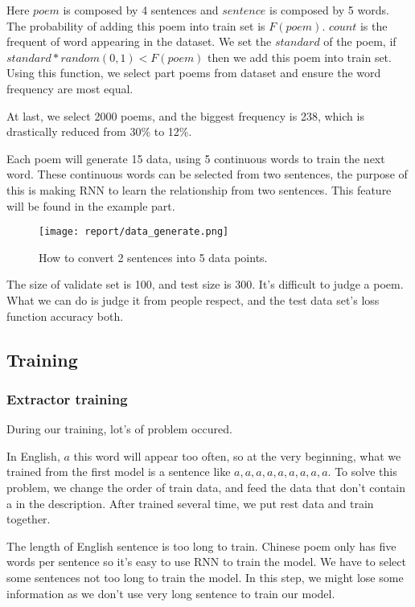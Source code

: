 \documentclass[10pt,twocolumn,letterpaper]{article}
\begin{document}
Here $poem$ is composed by 4 sentences and $sentence$ is composed by 5 words. The probability of adding this poem into train set is $F(poem)$. $count$ is the frequent of word appearing in the dataset. We set the $standard$ of the poem, if $standard*random(0, 1) < F(poem)$ then we add this poem into train set.
Using this function, we select part poems from dataset and ensure the word frequency are most equal. 

At last, we select 2000 poems, and the biggest frequency is 238, which is drastically reduced from 30\% to 12\%. 

Each poem will generate 15 data, using 5 continuous words to train the next word. These continuous words can be selected from two sentences, the purpose of this is making RNN to learn the relationship from two sentences. This feature will be found in the example part.

\begin{figure}[t]
\begin{center}
   \texttt{[image: report/data\_generate.png]}
\end{center}
   \caption{How to convert 2 sentences into 5 data points.}
\label{fig:data_generator}
\end{figure}

The size of validate set is 100, and test size is 300. It's difficult to judge a poem. What we can do is judge it from people respect, and the test data set's loss function accuracy both.
\subsection{Training}
\subsubsection{Extractor training}
During our training, lot's of problem occured. 

In English, $a$ this word will appear too often, so at the very beginning, what we trained from the first model is a sentence like $a,a,a,a,a,a,a,a,a$. To solve this problem, we change the order of train data, and feed the data that don't contain a in the description. After trained several time, we put rest data and train together.

The length of English sentence is too long to train. Chinese poem only has five words per sentence so it's easy to use RNN to train the model. We have to select some sentences not too long to train the model. In this step, we might lose some information as we don't use very long sentence to train our model.
\end{document}
